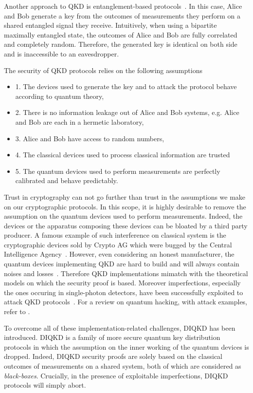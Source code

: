 Another approach to \acrshort{QKD} is entanglement-based protocols~\cite{Ekert1991}.
In this case, Alice and Bob generate a key from the outcomes of  measurements they perform on a shared entangled signal they receive.
Intuitively, when using a bipartite maximally entangled state, the outcomes of Alice and Bob are fully correlated and completely random.
Therefore, the generated key is identical on both side and is inaccessible to an eavesdropper.

\medbreak

The security of QKD protocols relies on the following assumptions
\begin{itemize}
	\item 1. The devices used to generate the key and to attack the protocol behave according to quantum theory,
	\item 2. There is no information leakage out of Alice and Bob systems, e.g. Alice and Bob are each in a hermetic laboratory,
	\item 3. Alice and Bob have access to random numbers,
	\item 4. The classical devices used to process classical information are trusted 
	\item 5. The quantum devices used to perform measurements are perfectly calibrated and behave predictably.
\end{itemize}

Trust in cryptography can not go further than trust in the assumptions we make on our cryptographic protocols. 
In this scope, it is highly desirable to remove the assumption on the quantum devices used to perform measurements.
Indeed, the devices or the apparatus composing these devices can be bloated by a third party producer.
A famous example of such interference on classical system is the cryptographic devices sold by Crypto AG which were bugged by the Central Intelligence Agency~\cite{Miller2020}.
However, even considering an honest manufacturer, the quantum devices implementing QKD are hard to build and will always contain noises and losses~\cite{Diamanti2016,Xu2020}.
Therefore QKD implementations mimatch with the theoretical models on which the security proof is based. 
Moreover imperfections, especially the ones occuring in single-photon detectors, have been successfully exploited to attack QKD protocols~\cite{Fung2007,Lydersen2010,Gerhardt2011,Weier2011}. 
For a review on quantum hacking, with attack examples, refer to \cite{Lo2014}.

\medbreak

To overcome all of these implementation-related challenges, \acrfull{DIQKD} has been introduced.
\acrshort{DIQKD} is a family of more secure quantum key distribution protocols in which the assumption on the inner working of the quantum devices is dropped.
Indeed, DIQKD security proofs are solely based on the classical outcomes of measurements on a shared system, both of which are considered as \textit{black-boxes}.
Crucially, in the presence of exploitable imperfections, DIQKD protocols will simply abort.


